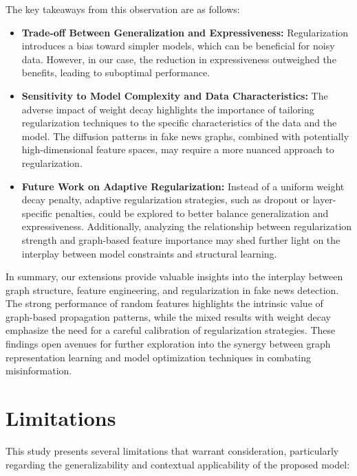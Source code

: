 \documentclass[sigconf,nonacm]{acmart}
\begin{document}
The key takeaways from this observation are as follows:
\begin{itemize}
    \item \textbf{Trade-off Between Generalization and Expressiveness:} Regularization introduces a bias toward simpler models, which can be beneficial for noisy data. However, in our case, the reduction in expressiveness outweighed the benefits, leading to suboptimal performance.
    \item \textbf{Sensitivity to Model Complexity and Data Characteristics:} The adverse impact of weight decay highlights the importance of tailoring regularization techniques to the specific characteristics of the data and the model. The diffusion patterns in fake news graphs, combined with potentially high-dimensional feature spaces, may require a more nuanced approach to regularization.
    \item \textbf{Future Work on Adaptive Regularization:} Instead of a uniform weight decay penalty, adaptive regularization strategies, such as dropout or layer-specific penalties, could be explored to better balance generalization and expressiveness. Additionally, analyzing the relationship between regularization strength and graph-based feature importance may shed further light on the interplay between model constraints and structural learning.
\end{itemize}

\vspace{1em} %

In summary, our extensions provide valuable insights into the interplay between graph structure, feature engineering, and regularization in fake news detection. The strong performance of random features highlights the intrinsic value of graph-based propagation patterns, while the mixed results with weight decay emphasize the need for a careful calibration of regularization strategies. These findings open avenues for further exploration into the synergy between graph representation learning and model optimization techniques in combating misinformation.



\section{Limitations}

This study presents several limitations that warrant consideration, particularly regarding the generalizability and contextual applicability of the proposed model:
\end{document}
